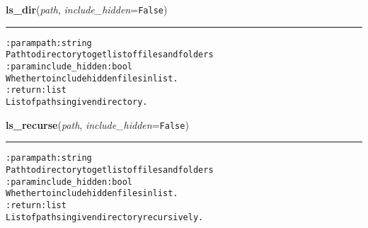     \label{hal:files:models:FileSystem:ls_dir}

    \vspace{0.5ex}

\hspace{.8\funcindent}\begin{boxedminipage}{\funcwidth}

    \raggedright \textbf{ls\_dir}(\textit{path}, \textit{include\_hidden}={\tt False})

    \vspace{-1.5ex}

    \rule{\textwidth}{0.5\fboxrule}
\setlength{\parskip}{2ex}
\begin{alltt}

:param path: string
    Path to directory to get list of files and folders
:param include\_hidden: bool
    Whether to include hidden files in list.
:return: list
    List of paths in given directory.
\end{alltt}

\setlength{\parskip}{1ex}
    \end{boxedminipage}

    \label{hal:files:models:FileSystem:ls_recurse}

    \vspace{0.5ex}

\hspace{.8\funcindent}\begin{boxedminipage}{\funcwidth}

    \raggedright \textbf{ls\_recurse}(\textit{path}, \textit{include\_hidden}={\tt False})

    \vspace{-1.5ex}

    \rule{\textwidth}{0.5\fboxrule}
\setlength{\parskip}{2ex}
\begin{alltt}

:param path: string
    Path to directory to get list of files and folders
:param include\_hidden: bool
    Whether to include hidden files in list.
:return: list
    List of paths in given directory recursively.
\end{alltt}

\setlength{\parskip}{1ex}
    \end{boxedminipage}

